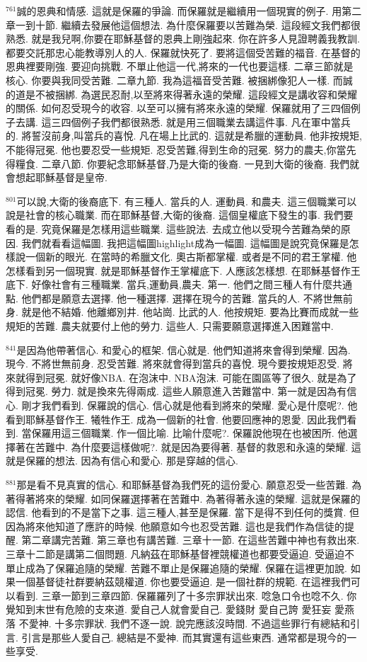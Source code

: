 \documentclass{book}
\begin{document}
$^{761}$誠的恩典和情感.
這就是保羅的爭論.
而保羅就是繼續用一個現實的例子.
用第二章一到十節.
繼續去發展他這個想法.
為什麼保羅要以苦難為榮.
這段經文我們都很熟悉.
就是我兒啊,你要在耶穌基督的恩典上剛強起來.
你在許多人見證聘義我教訓.
都要交託那忠心能教導別人的人.
保羅就快死了.
要將這個受苦難的福音.
在基督的恩典裡要剛強.
要迎向挑戰.
不單止他這一代,將來的一代也要這樣.
二章三節就是核心.
你要與我同受苦難.
二章九節.
我為這福音受苦難.
被捆綁像犯人一樣.
而誠的道是不被捆綁.
為選民忍耐,以至將來得著永遠的榮耀.
這段經文是講收容和榮耀的關係.
如何忍受現今的收容.
以至可以擁有將來永遠的榮耀.
保羅就用了三四個例子去講.
這三四個例子我們都很熟悉.
就是用三個職業去講這件事.
凡在軍中當兵的.
將誓沒前身,叫當兵的喜悅.
凡在場上比武的.
這就是希臘的運動員.
他非按規矩,不能得冠冕.
他也要忍受一些規矩.
忍受苦難,得到生命的冠冕.
努力的農夫,你當先得糧食.
二章八節.
你要紀念耶穌基督,乃是大衛的後裔.
一見到大衛的後裔.
我們就會想起耶穌基督是皇帝.

$^{801}$可以說,大衛的後裔底下.
有三種人.
當兵的人.
運動員.
和農夫.
這三個職業可以說是社會的核心職業.
而在耶穌基督,大衛的後裔.
這個皇權底下發生的事.
我們要看的是.
究竟保羅是怎樣用這些職業.
這些說法.
去成立他以受現今苦難為榮的原因.
我們就看看這幅圖.
我把這幅圖highlight成為一幅圖.
這幅圖是說究竟保羅是怎樣說一個新的眼光.
在當時的希臘文化.
奧古斯都掌權.
或者是不同的君王掌權.
他怎樣看到另一個現實.
就是耶穌基督作王掌權底下.
人應該怎樣想.
在耶穌基督作王底下.
好像社會有三種職業.
當兵,運動員,農夫.
第一.
他們之間三種人有什麼共通點.
他們都是願意去選擇.
他一種選擇.
選擇在現今的苦難.
當兵的人.
不將世無前身.
就是他不結婚.
他離鄉別井.
他站崗.
比武的人.
他按規矩.
要為比賽而成就一些規矩的苦難.
農夫就要付上他的勞力.
這些人.
只需要願意選擇進入困難當中.

$^{841}$是因為他帶著信心.
和愛心的框架.
信心就是.
他們知道將來會得到榮耀.
因為.
現今.
不將世無前身.
忍受苦難.
將來就會得到當兵的喜悅.
現今要按規矩忍受.
將來就得到冠冕.
就好像NBA.
在泡沫中.
NBA泡沫.
可能在園區等了很久.
就是為了得到冠冕.
勞力.
就是換來先得兩成.
這些人願意進入苦難當中.
第一就是因為有信心.
剛才我們看到.
保羅說的信心.
信心就是他看到將來的榮耀.
愛心是什麼呢?.
他看到耶穌基督作王.
犧牲作王.
成為一個新的社會.
他要回應神的恩愛.
因此我們看到.
當保羅用這三個職業.
作一個比喻.
比喻什麼呢?.
保羅說他現在也被困所.
他選擇著在苦難中.
為什麼要這樣做呢?.
就是因為要得著.
基督的救恩和永遠的榮耀.
這就是保羅的想法.
因為有信心和愛心.
那是穿越的信心.

$^{881}$那是看不見真實的信心.
和耶穌基督為我們死的這份愛心.
願意忍受一些苦難.
為著得著將來的榮耀.
如同保羅選擇著在苦難中.
為著得著永遠的榮耀.
這就是保羅的認信.
他看到的不是當下之事.
這三種人,甚至是保羅.
當下是得不到任何的獎賞.
但因為將來他知道了應許的時候.
他願意如今也忍受苦難.
這也是我們作為信徒的提醒.
第二章講完苦難.
第三章也有講苦難.
三章十一節.
在這些苦難中神也有救出來.
三章十二節是講第二個問題.
凡納茲在耶穌基督裡競權道也都要受逼迫.
受逼迫不單止成為了保羅追隨的榮耀.
苦難不單止是保羅追隨的榮耀.
保羅在這裡更加說.
如果一個基督徒社群要納茲競權道.
你也要受逼迫.
是一個社群的規範.
在這裡我們可以看到.
三章一節到三章四節.
保羅羅列了十多宗罪狀出來.
唸急口令也唸不久.
你覺知到末世有危險的支來道.
愛自己人就會愛自己.
愛錢財 愛自己誇 愛狂妄 愛燕落 不愛神.
十多宗罪狀.
我們不逐一說.
說完應該沒時間.
不過這些罪行有總結和引言.
引言是那些人愛自己.
總結是不愛神.
而其實還有這些東西.
通常都是現今的一些享受.
\end{document}
